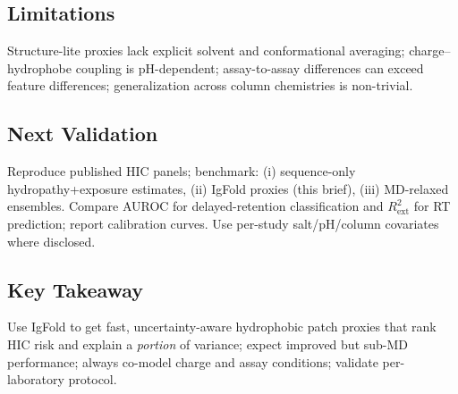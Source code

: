 \subsection*{Limitations}
Structure-lite proxies lack explicit solvent and conformational averaging; charge–hydrophobe coupling is pH-dependent; assay-to-assay differences can exceed feature differences; generalization across column chemistries is non-trivial.

\subsection*{Next Validation}
Reproduce published HIC panels; benchmark: (i) sequence-only hydropathy+exposure estimates, (ii) IgFold proxies (this brief), (iii) MD-relaxed ensembles. Compare AUROC for delayed-retention classification and $R^{2}_{\mathrm{ext}}$ for RT prediction; report calibration curves. Use per-study salt/pH/column covariates where disclosed.

\subsection*{Key Takeaway}
Use IgFold to get fast, uncertainty-aware hydrophobic patch proxies that rank HIC risk and explain a \emph{portion} of variance; expect improved but sub-MD performance; always co-model charge and assay conditions; validate per-laboratory protocol.
